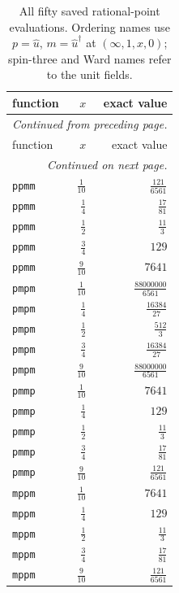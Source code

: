 \begingroup\small
\setlength{\tabcolsep}{5pt}
\begin{longtable}{lrr}
\caption{All fifty saved rational-point evaluations. Ordering names use $p=\widehat u$, $m=\widehat u^\dagger$ at $(\infty,1,x,0)$; spin-three and Ward names refer to the unit fields.}\label{expphysics:correlator-samples}\\
\toprule
function & $x$ & exact value\\
\midrule
\endfirsthead
\multicolumn{3}{l}{\small\itshape Continued from preceding page.}\\
\toprule
function & $x$ & exact value\\
\midrule
\endhead
\midrule
\multicolumn{3}{r}{\small\itshape Continued on next page.}\\
\endfoot
\bottomrule
\endlastfoot
\texttt{ppmm} & $\frac{1}{10}$ & $\frac{121}{6561}$\\
\texttt{ppmm} & $\frac{1}{4}$ & $\frac{17}{81}$\\
\texttt{ppmm} & $\frac{1}{2}$ & $\frac{11}{3}$\\
\texttt{ppmm} & $\frac{3}{4}$ & $129$\\
\texttt{ppmm} & $\frac{9}{10}$ & $7641$\\
\texttt{pmpm} & $\frac{1}{10}$ & $\frac{88000000}{6561}$\\
\texttt{pmpm} & $\frac{1}{4}$ & $\frac{16384}{27}$\\
\texttt{pmpm} & $\frac{1}{2}$ & $\frac{512}{3}$\\
\texttt{pmpm} & $\frac{3}{4}$ & $\frac{16384}{27}$\\
\texttt{pmpm} & $\frac{9}{10}$ & $\frac{88000000}{6561}$\\
\texttt{pmmp} & $\frac{1}{10}$ & $7641$\\
\texttt{pmmp} & $\frac{1}{4}$ & $129$\\
\texttt{pmmp} & $\frac{1}{2}$ & $\frac{11}{3}$\\
\texttt{pmmp} & $\frac{3}{4}$ & $\frac{17}{81}$\\
\texttt{pmmp} & $\frac{9}{10}$ & $\frac{121}{6561}$\\
\texttt{mppm} & $\frac{1}{10}$ & $7641$\\
\texttt{mppm} & $\frac{1}{4}$ & $129$\\
\texttt{mppm} & $\frac{1}{2}$ & $\frac{11}{3}$\\
\texttt{mppm} & $\frac{3}{4}$ & $\frac{17}{81}$\\
\texttt{mppm} & $\frac{9}{10}$ & $\frac{121}{6561}$\\

\end{longtable}
